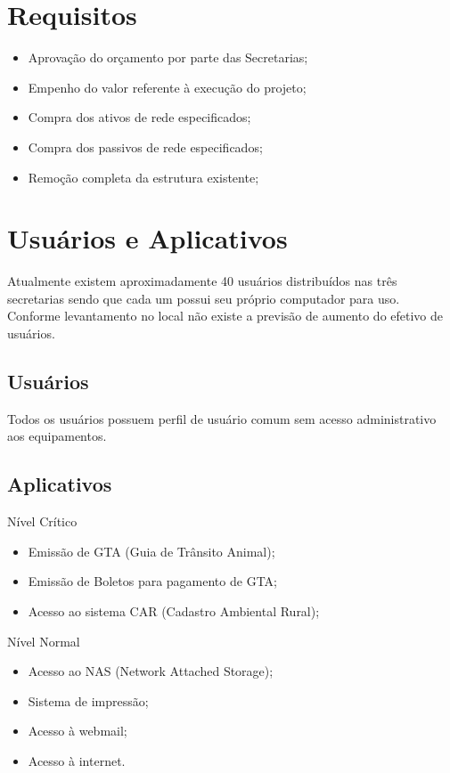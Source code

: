 \documentclass[	DIV=calc,%
							paper=a4,%
							fontsize=12pt,%
							onecolumn]{scrartcl}	 					%
\begin{document}
\section{Requisitos}
\begin{itemize}
	\item Aprovação do orçamento por parte das Secretarias;
	\item Empenho do valor referente à execução do projeto;
	\item Compra dos ativos de rede especificados;
	\item Compra dos passivos de rede especificados;
	\item Remoção completa da estrutura existente;
\end{itemize}

\section{Usuários e Aplicativos}
Atualmente existem aproximadamente 40 usuários distribuídos nas três secretarias sendo que cada um possui seu próprio computador para uso. Conforme levantamento no local não existe a previsão de aumento do efetivo de usuários.

 

\subsection{Usuários}
Todos os usuários possuem perfil de usuário comum sem acesso administrativo aos equipamentos.



\subsection{Aplicativos}
Nível Crítico
\begin{itemize}
	\item Emissão de GTA (Guia de Trânsito Animal);
	\item Emissão de Boletos para pagamento de GTA;
	\item Acesso ao sistema CAR (Cadastro Ambiental Rural);
\end{itemize}
Nível Normal
\begin{itemize}
	\item Acesso ao NAS (Network Attached Storage);
	\item Sistema de impressão;
	\item Acesso à webmail;
	\item Acesso à internet.
\end{itemize}
\end{document}
